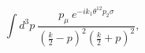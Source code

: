 \begin{equation}
    \int d^3 p~
    \frac{p_\mu~ e^{-i k_1 \theta^{12} p_2 \sigma}}
         {(\frac{k}{2} - p)^2 (\frac{k}{2} + p)^2},
\end{equation}

